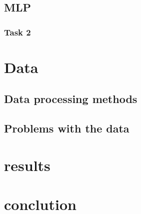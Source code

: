 \documentclass{IEEEtran}
\begin{document}
\subsection{MLP}
\subsubsection{Task 2}
\section{Data}
\subsection{Data processing methods}
\subsection{Problems with the data}
\section{results}
\section{conclution}
\end{document}
